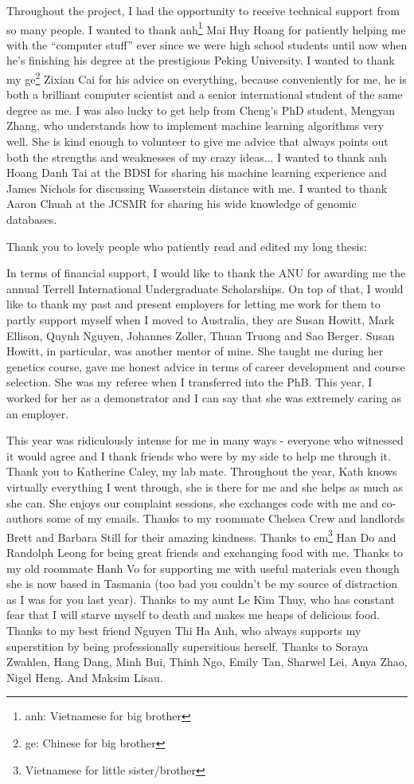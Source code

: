 Throughout the project, I had the opportunity to receive technical support from so many people. I wanted to thank anh\footnote{anh: Vietnamese for big brother} Mai Huy Hoang for patiently helping me with the ``computer stuff'' ever since we were high school students until now when he's finishing his degree at the prestigious Peking University. I wanted to thank my ge\footnote{ge: Chinese for big brother} Zixian Cai for his advice on everything, because conveniently for me, he is both a brilliant computer scientist and a senior international student of the same degree as me. I was also lucky to get help from Cheng's PhD student, Mengyan Zhang, who understands how to implement machine learning algorithms very well. She is kind enough to volunteer to give me advice that always points out both the strengths and weaknesses of my crazy ideas... I wanted to thank anh Hoang Danh Tai at the BDSI for sharing his machine learning experience and James Nichols for discussing Wasserstein distance with me. I wanted to thank Aaron Chuah at the JCSMR for sharing his wide knowledge of genomic databases. 

Thank you to lovely people who patiently read and edited my long thesis: 

In terms of financial support, I would like to thank the ANU for awarding me the annual Terrell International Undergraduate Scholarships. On top of that, I would like to thank my past and present employers for letting me work for them to partly support myself when I moved to Australia, they are Susan Howitt, Mark Ellison, Quynh Nguyen, Johannes Zoller, Thuan Truong and Sao Berger. Susan Howitt, in particular, was another mentor of mine. She taught me during her genetics course, gave me honest advice in terms of career development and course selection. She was my referee when I transferred into the PhB. This year, I worked for her as a demonstrator and I can say that she was extremely caring as an employer. 

This year was ridiculously intense for me in many ways - everyone who witnessed it would agree and I thank friends who were by my side to help me through it. Thank you to Katherine Caley, my lab mate. Throughout the year, Kath knows virtually everything I went through, she is there for me and she helps as much as she can. She enjoys our complaint sessions, she exchanges code with me and co-authors some of my emails. Thanks to my roommate Chelsea Crew and landlords Brett and Barbara Still for their amazing kindness. Thanks to em\footnote{Vietnamese for little sister/brother} Han Do and Randolph Leong for being great friends and exchanging food with me. Thanks to my old roommate Hanh Vo for supporting me with useful materials even though she is now based in Tasmania (too bad you couldn't be my source of distraction as I was for you last year). Thanks to my aunt Le Kim Thuy, who has constant fear that I will starve myself to death and makes me heaps of delicious food. Thanks to my best friend Nguyen Thi Ha Anh, who always supports my superstition by being professionally supersitious herself. Thanks to Soraya Zwahlen, Hang Dang, Minh Bui, Thinh Ngo, Emily Tan, Sharwel Lei, Anya Zhao, Nigel Heng. And Maksim Lisau. 


